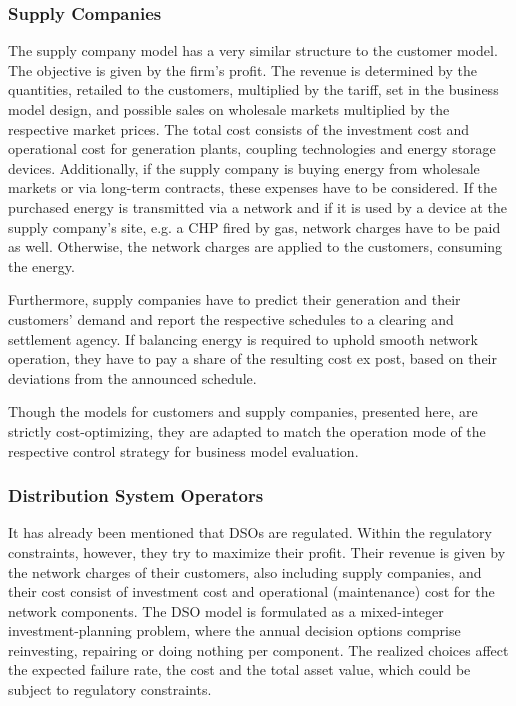 \documentclass[conference]{IEEEtran}
\begin{document}
\subsubsection{Supply Companies}
The supply company model has a very similar structure to the customer
model. The objective is given by the firm’s profit. The revenue is
determined by the quantities, retailed to the customers, multiplied by
the tariff, set in the business model design, and possible sales on
wholesale markets multiplied by the respective market prices. The
total cost consists of the investment cost and operational cost for
generation plants, coupling technologies and energy storage
devices. Additionally, if the supply company is buying energy from
wholesale markets or via long-term contracts, these expenses have to
be considered. If the purchased energy is transmitted via a network
and if it is used by a device at the supply company’s site, e.g. a CHP
fired by gas, network charges have to be paid as well. Otherwise, the
network charges are applied to the customers, consuming the energy. 

Furthermore, supply companies have to predict their generation and
their customers’ demand and report the respective schedules to a
clearing and settlement agency. If balancing energy is required to
uphold smooth network operation, they have to pay a share of the
resulting cost ex post, based on their deviations from the announced
schedule. 

Though the models for customers and supply companies, presented here,
are strictly cost-optimizing, they are adapted to match the operation
mode of the respective control strategy for business model
evaluation. 

\subsubsection{Distribution System Operators}
It has already been mentioned that DSOs are regulated. Within the
regulatory constraints, however, they try to maximize their
profit. Their revenue is given by the network charges of their
customers, also including supply companies, and their cost consist of
investment cost and operational (maintenance) cost for the network
components. The DSO model is formulated as a mixed-integer
investment-planning problem, where the annual decision options
comprise reinvesting, repairing or doing nothing per component. The
realized choices affect the expected failure rate, the cost and the
total asset value, which could be subject to regulatory constraints. 
\end{document}

